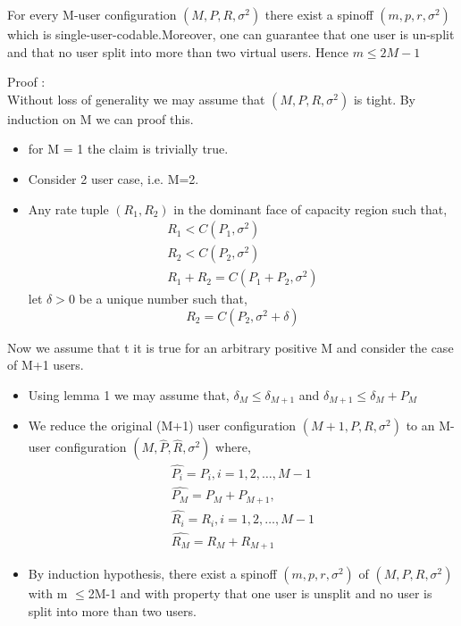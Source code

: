 \documentclass[10pt]{beamer}
\begin{document}
\begin{frame}[t]{}
\begin{theorem}
	For every M-user configuration $\left(M, P, R, \sigma^2 \right)$ there exist a spinoff $\left( m,p,r, \sigma^2\right)$ which is single-user-codable.Moreover, one can guarantee that one user is un-split and that no user split into more than two virtual users. Hence $m\leq 2M-1$
\end{theorem}

Proof :\\
Without loss of generality we may assume that $\left(M,P,R,\sigma^2\right)$ is tight. By induction on M we can proof this.
	\begin{itemize}
	\item for M = 1 the claim is trivially true.
	\item Consider 2 user case, i.e. M=2.
		\item Any rate tuple $(R_1, R_2)$ in the dominant face of capacity region such that,
	\begin{align*}
		R_1< C(P_1, \sigma^2)\\
		R_2 < C(P_2, \sigma^2) \\
		R_1+ R_2 = C(P_1 +P_2 , \sigma^2)
	\end{align*}
let $\delta >0 $ be a unique number such that,
\begin{equation}
	 R_2 = C(P_2 , \sigma^2 + \delta)
\end{equation}
\end{itemize}
\end{frame}
\begin{frame}[t]
Now we assume that
t it is true for an arbitrary positive M and consider the case of M+1 users.
\begin{itemize}
	\item Using lemma 1 we may assume that,
	$\delta_M \leq \delta_{M+1}$ and $\delta_{M+1}\leq \delta_M +P_M$
	\item We reduce the original (M+1) user configuration $\left(M+1, P,R, \sigma^2\right)$ to an M-user configuration $\left(M,\hat{P}, \hat{R}, \sigma^2\right)$ where,\\
	\begin{align*}	
	\hat{P_i} = P_i, i = 1,2, \dots, M-1\\
	\hat{P_M} = P_M + P_{M+1},\\   \hat{R_i} = R_i,   i = 1,2, \dots, M-1 \\  \hat{R_M} = R_M + R_{M+1}
\end{align*}
\item By induction hypothesis, there exist a spinoff $\left(m ,p, r, \sigma^2 \right)$ of $\left(M,P,R,\sigma^2 \right)$ with m $\leq$2M-1 and with property that one user is unsplit and no user is split into more than two users.
\end{itemize}
\end{frame}
\end{document}
